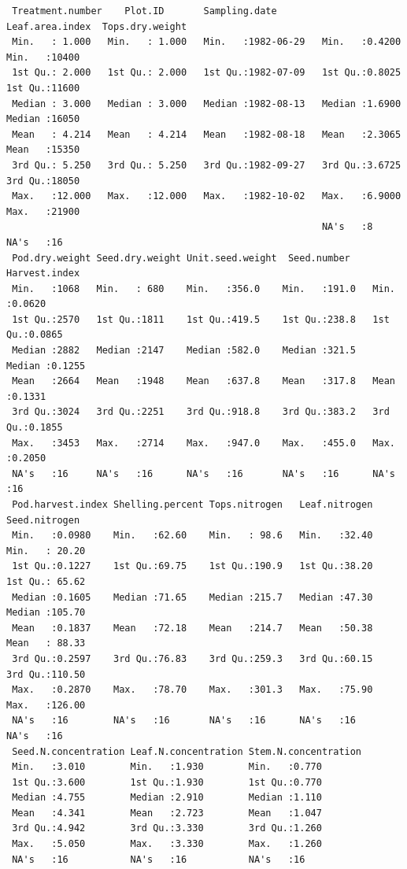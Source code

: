 \documentclass[
]{article}
\begin{document}
\begin{verbatim}
 Treatment.number    Plot.ID       Sampling.date        Leaf.area.index  Tops.dry.weight
 Min.   : 1.000   Min.   : 1.000   Min.   :1982-06-29   Min.   :0.4200   Min.   :10400  
 1st Qu.: 2.000   1st Qu.: 2.000   1st Qu.:1982-07-09   1st Qu.:0.8025   1st Qu.:11600  
 Median : 3.000   Median : 3.000   Median :1982-08-13   Median :1.6900   Median :16050  
 Mean   : 4.214   Mean   : 4.214   Mean   :1982-08-18   Mean   :2.3065   Mean   :15350  
 3rd Qu.: 5.250   3rd Qu.: 5.250   3rd Qu.:1982-09-27   3rd Qu.:3.6725   3rd Qu.:18050  
 Max.   :12.000   Max.   :12.000   Max.   :1982-10-02   Max.   :6.9000   Max.   :21900  
                                                        NA's   :8        NA's   :16     
 Pod.dry.weight Seed.dry.weight Unit.seed.weight  Seed.number    Harvest.index   
 Min.   :1068   Min.   : 680    Min.   :356.0    Min.   :191.0   Min.   :0.0620  
 1st Qu.:2570   1st Qu.:1811    1st Qu.:419.5    1st Qu.:238.8   1st Qu.:0.0865  
 Median :2882   Median :2147    Median :582.0    Median :321.5   Median :0.1255  
 Mean   :2664   Mean   :1948    Mean   :637.8    Mean   :317.8   Mean   :0.1331  
 3rd Qu.:3024   3rd Qu.:2251    3rd Qu.:918.8    3rd Qu.:383.2   3rd Qu.:0.1855  
 Max.   :3453   Max.   :2714    Max.   :947.0    Max.   :455.0   Max.   :0.2050  
 NA's   :16     NA's   :16      NA's   :16       NA's   :16      NA's   :16      
 Pod.harvest.index Shelling.percent Tops.nitrogen   Leaf.nitrogen   Seed.nitrogen   
 Min.   :0.0980    Min.   :62.60    Min.   : 98.6   Min.   :32.40   Min.   : 20.20  
 1st Qu.:0.1227    1st Qu.:69.75    1st Qu.:190.9   1st Qu.:38.20   1st Qu.: 65.62  
 Median :0.1605    Median :71.65    Median :215.7   Median :47.30   Median :105.70  
 Mean   :0.1837    Mean   :72.18    Mean   :214.7   Mean   :50.38   Mean   : 88.33  
 3rd Qu.:0.2597    3rd Qu.:76.83    3rd Qu.:259.3   3rd Qu.:60.15   3rd Qu.:110.50  
 Max.   :0.2870    Max.   :78.70    Max.   :301.3   Max.   :75.90   Max.   :126.00  
 NA's   :16        NA's   :16       NA's   :16      NA's   :16      NA's   :16      
 Seed.N.concentration Leaf.N.concentration Stem.N.concentration
 Min.   :3.010        Min.   :1.930        Min.   :0.770       
 1st Qu.:3.600        1st Qu.:1.930        1st Qu.:0.770       
 Median :4.755        Median :2.910        Median :1.110       
 Mean   :4.341        Mean   :2.723        Mean   :1.047       
 3rd Qu.:4.942        3rd Qu.:3.330        3rd Qu.:1.260       
 Max.   :5.050        Max.   :3.330        Max.   :1.260       
 NA's   :16           NA's   :16           NA's   :16          
\end{verbatim}
\end{document}
